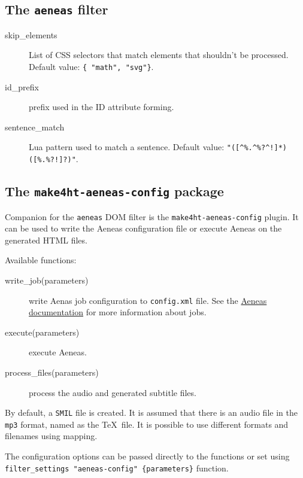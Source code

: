 \subsection{\texorpdfstring{The \texttt{aeneas}
filter}{The aeneas filter}}\label{the-aeneas-filter}

\begin{description}
\item[skip\_elements]
List of CSS selectors that match elements that shouldn't be processed.
Default value: \texttt{\{\ "math",\ "svg"\}}.
\item[id\_prefix]
prefix used in the ID attribute forming.
\item[sentence\_match]
Lua pattern used to match a sentence. Default value:
\texttt{"({[}\^{}\%.\^{}\%?\^{}!{]}*)({[}\%.\%?!{]}?)"}.
\end{description}

\subsection{\texorpdfstring{The \texttt{make4ht-aeneas-config}
package}{The make4ht-aeneas-config package}}\label{the-make4ht-aeneas-config-package}

Companion for the \texttt{aeneas} DOM filter is the
\texttt{make4ht-aeneas-config} plugin. It can be used to write the
Aeneas configuration file or execute Aeneas on the generated HTML files.

Available functions:

\begin{description}
\item[write\_job(parameters)]
write Aenas job configuration to \texttt{config.xml} file. See the
\href{https://www.readbeyond.it/aeneas/docs/clitutorial.html\#processing-jobs}{Aeneas
documentation} for more information about jobs.
\item[execute(parameters)]
execute Aeneas.
\item[process\_files(parameters)]
process the audio and generated subtitle files.
\end{description}

By default, a \texttt{SMIL} file is created. It is assumed that there is
an audio file in the \texttt{mp3} format, named as the \TeX~file. It is
possible to use different formats and filenames using mapping.

The configuration options can be passed directly to the functions or set
using \texttt{filter\_settings\ "aeneas-config"\ \{parameters\}}
function.

